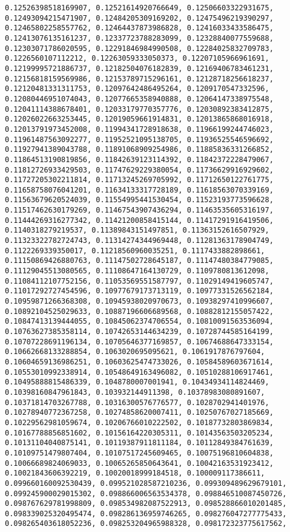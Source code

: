 \documentclass[11pt]{article}
\begin{document}
\begin{Verbatim}[commandchars=\\\{\}]
0.12526398518169907, 0.12521614920766649, 0.12506603322931675, 0.12493094215471907, 0.12484205309169202, 0.12475496219390297, 0.12465802258557762, 0.12464437873986828, 0.12416033433586475, 0.12413076135161237, 0.12337723788283099, 0.12328840077559688, 0.12303071786020595, 0.12291846984990508, 0.12284025832709783, 0.1226560107112212, 0.12263059333050373, 0.12207105966961691, 0.12199995721886737, 0.12182504076182839, 0.12169406783461231, 0.12156818159569986, 0.12153789715296161, 0.12128718256618237, 0.12120481331311753, 0.12097642486495264, 0.1209170547332596, 0.12080446951074043, 0.12077665358940888, 0.12064147338975548, 0.12041114388678401, 0.12033179770357776, 0.12030892383412875, 0.12026022663253445, 0.12019059661914831, 0.12013865868016918, 0.12013791973452008, 0.11994341728918638, 0.11966199244746023, 0.11961487563092277, 0.11952521095138705, 0.11936525546596692, 0.11927941389043788, 0.11891068909254986, 0.11885836331266852, 0.11864513190819856, 0.11842639123114392, 0.11842372228479067, 0.11812726933429503, 0.11747629229380054, 0.11736629916929602, 0.11727205302211814, 0.11713245269705992, 0.11712650122761775, 0.11658758076041201, 0.11634133317728189, 0.11618563070339169, 0.11563679620524039, 0.11554995441530454, 0.11523193773596628, 0.11517462630179269, 0.11467543907436294, 0.11463535605316197, 0.11444269316277342, 0.11421200858415144, 0.11417291916419506, 0.1140318279219537, 0.11389843151497851, 0.11363152616507929, 0.11323322782724743, 0.11314274344969448, 0.11281363178904749, 0.1122269339350017, 0.11218560960035251, 0.1117433882898661, 0.11150869426880763, 0.11147502728645187, 0.11147480384779085, 0.11129045513080565, 0.11108647164130729, 0.1109780813612098, 0.11084112107752156, 0.11053569551587797, 0.11029149419605747, 0.11017292727454596, 0.10977679173713119, 0.10977331526562184, 0.10959871266368308, 0.10945938020970673, 0.10938297410996607, 0.10892104525029633, 0.10887196606689568, 0.10882812155057422, 0.10847413139444055, 0.10845062374706554, 0.10810091563536094, 0.10763627385358114, 0.10742653144634239, 0.10728744585164199, 0.10707228691196134, 0.10705646377169857, 0.10674688647333154, 0.10662668133288854, 0.1063020695095621, 0.1061917876797604, 0.10604659136986251, 0.10603625474733026, 0.10584589603671614, 0.10553010992338914, 0.10548649163496082, 0.10510288106917461, 0.10495888815486339, 0.1048780007001941, 0.10434934114824469, 0.10398160847961843, 0.103932144911398, 0.10378983080891607, 0.10371814703267788, 0.10316300576776577, 0.1028702941401976, 0.10278940772367258, 0.10274858620007411, 0.10250767027185669, 0.10229562981059674, 0.10206766010222502, 0.10187732803869834, 0.10167788856851602, 0.10156164220305311, 0.10143563503205234, 0.10131104040875141, 0.10119387911811184, 0.10112849384761639, 0.10109751479807404, 0.10107517245609465, 0.10075196810604838, 0.10066689824069033, 0.10065265850643641, 0.10042163531923412, 0.10021843606392219, 0.10020018999184518, 0.100009117386611, 0.099660160092530439, 0.099521028587210236, 0.099309489629679101, 0.099245900029015302, 0.098866006563534378, 0.098846510087450726, 0.098767629781998809, 0.098534982087522913, 0.098528866010201485, 0.098339025320495474, 0.098286136959746265, 0.098276047277775433, 0.098265403618052236, 0.098253204965988328, 0.098172323775617562, 
\end{Verbatim}
\end{document}
